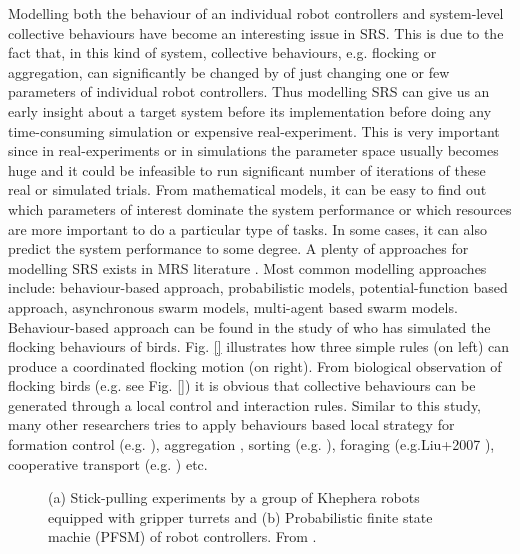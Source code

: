 Modelling both the behaviour  of an individual robot controllers and system-level collective behaviours have become an interesting issue in SRS. This is due to the fact that, in this kind of system, collective behaviours, e.g. flocking or aggregation, can significantly be changed by of just changing one or few parameters of individual robot controllers. Thus modelling SRS can give us an early insight about a target system before its implementation before doing any time-consuming simulation or expensive real-experiment. This is very important since in real-experiments or in simulations the parameter space usually becomes huge and it could be infeasible to run significant number of  iterations of these real or simulated trials. From mathematical models, it can be easy to find out which parameters of interest dominate the system performance or which resources are more important to do a particular type of tasks. In some cases, it can also predict the system performance to some degree. 
A plenty of approaches for modelling SRS exists in MRS literature \cite{Gazi+2006}. Most common modelling approaches include: behaviour-based approach, probabilistic models, potential-function based approach, asynchronous swarm models, multi-agent based swarm models. Behaviour-based approach can be found in the study of   who has simulated the flocking behaviours of birds. Fig. \ref{} illustrates how three simple rules (on left) can produce a coordinated flocking motion (on right). From  biological observation of flocking birds (e.g. see Fig. \ref{}) it is obvious that collective  behaviours can be generated through a local control and interaction rules. Similar to this study, many other researchers tries to apply behaviours based local strategy for  formation control (e.g. \cite{Balch+1998}),  aggregation , sorting (e.g. \cite{Melhuish+1998}), foraging (e.g.Liu+2007 ), cooperative transport (e.g. \cite{Kube1997}) etc.\\
\begin{figure}
\centering
{} 
\hspace{0.5cm}
\caption{ (a) Stick-pulling experiments by a group of  Khephera robots equipped with gripper turrets and (b) Probabilistic finite state machie (PFSM) of robot controllers. From \protect{}.}
\label{fig:stick-pulling-expt}
\end{figure}
